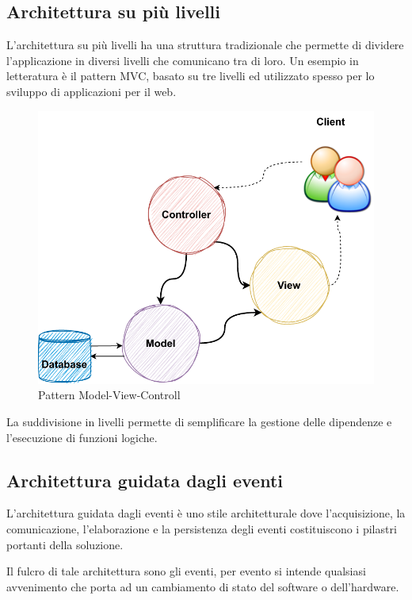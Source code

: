 \subsection{Architettura su più livelli}
L'architettura su più livelli ha una struttura tradizionale che permette di dividere l'applicazione in diversi livelli che comunicano tra di loro. Un esempio in letteratura è il pattern \ac{MVC}, basato su tre livelli ed utilizzato spesso per lo sviluppo di applicazioni per il web. 

\begin{figure}[h]
    \centering
    \includegraphics[scale = 0.65]{capitoli/immagini/02_pattern_mvc.pdf}
    \caption{Pattern Model-View-Controll}
    \label{fig:pattern_mvc}
\end{figure}

La suddivisione in livelli permette di semplificare la gestione delle dipendenze e l'esecuzione di funzioni logiche.

\subsection{Architettura guidata dagli eventi}
L'architettura guidata dagli eventi \cite{Event_Drive} è uno stile architetturale dove l'acquisizione, la comunicazione, l'elaborazione e la persistenza degli eventi costituiscono i pilastri portanti della soluzione.

Il fulcro di tale architettura sono gli eventi, per evento si intende qualsiasi avvenimento che porta ad un cambiamento di stato del software o dell'hardware.

